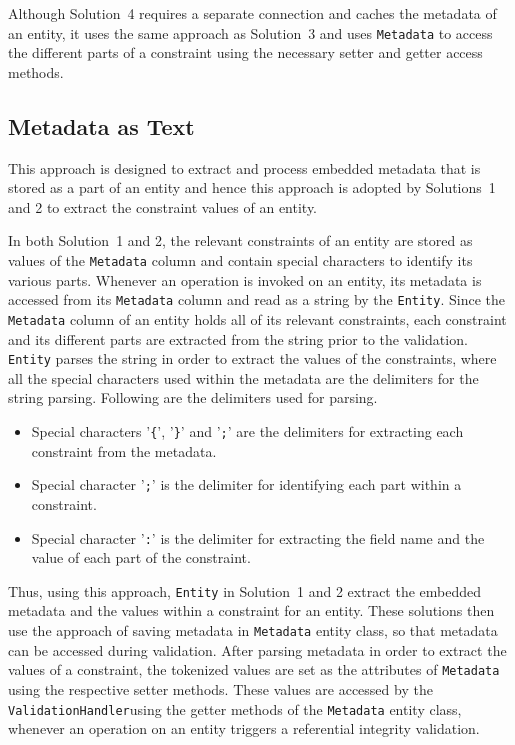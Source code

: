 Although Solution~4 requires a separate connection and caches the metadata of
an entity,  it uses the same approach as Solution~3 and 
uses \texttt{Metadata} to access the different parts of a constraint using the
necessary setter and getter access methods. 



\subsection{Metadata as Text}\label{ss:implementation-MDText}

This approach is designed to extract and process embedded metadata that is
stored as a part of an entity and hence this approach is adopted by Solutions~1
and 2  to extract the constraint values of an entity.  

In both Solution~1 and 2,  the relevant constraints of an entity are stored as
values of the \texttt{Metadata} column and contain special characters to
identify its various parts. 
Whenever an operation is invoked on an entity,  its metadata is accessed from
its \texttt{Metadata} column and read as a string by the
\texttt{Entity}.  Since the \texttt{Metadata} column of an
entity holds all of its relevant constraints,  each constraint and its different
parts are extracted from the string prior to the validation. 
 \texttt{Entity} parses the string in order to extract the values of
the constraints,  where all the special characters used within the metadata are
the delimiters for the string parsing.  Following are the delimiters used for
parsing. 
		\begin{itemize}
		  \item Special characters '\texttt{\{}',  '\texttt{\}}' and '\texttt{;}' are
		  the delimiters for extracting each constraint from the metadata. 
		  \item Special character '\texttt{;}' is the delimiter for identifying each
		  part within a constraint. 
		  \item Special character '\texttt{:}' is the delimiter for extracting the
		  field name and the value of each part of the constraint. 
		\end{itemize}


Thus,  using this  approach,   \texttt{Entity} in Solution~1 and 2   extract the
embedded metadata and the values within a constraint for an entity. 
These solutions then use the approach of saving metadata in \texttt{Metadata}
entity class,  so that metadata can be accessed during validation. 
After parsing metadata in order to extract the values of a constraint,  the
tokenized values are set as the attributes of \texttt{Metadata} using the
respective setter methods.  These values are accessed by the
\texttt{ValidationHandler}using the getter methods of
the \texttt{Metadata} entity class,  whenever an operation on an entity triggers
a referential integrity validation.  

